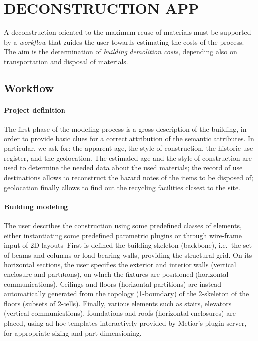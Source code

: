 \documentclass[a4paper,twoside]{article}
\begin{document}
%
\section{\uppercase{Deconstruction App}}
\label{sec:application}

\noindent
A deconstruction oriented to the maximum reuse of materials must be supported by a \emph{workflow} that guides the user towards estimating the costs of the process. The aim is the determination of  \emph{building demolition costs}, depending also on transportation  and disposal of materials.

\subsection{Workflow}

\paragraph{Project definition} 

\noindent
The first phase of the modeling process is a gross description of the building, in order to provide basic clues for a correct attribution of the semantic attributes.
In particular, we ask for: the apparent age, the style of construction, the historic use register, and the geolocation.
The estimated age and the style of construction are used to determine the needed data about the used materials; the record of use destinations allows to reconstruct the hazard notes of the items to be disposed of; geolocation finally allows to find out the recycling facilities closest to the site.

\paragraph{Building modeling} 

\noindent
The user describes the construction using some predefined classes of elements, either instantiating some  predefined parametric plugins or through wire-frame input of 2D layouts. 
First is defined the building skeleton (backbone), i.e.~the set of beams and columns or load-bearing walls, providing the structural grid.
On its horizontal sections, the user specifies the exterior and interior walls (vertical enclosure and partitions), on which the fixtures are positioned (horizontal communications).
Ceilings and floors (horizontal partitions) are instead automatically generated from the topology (1-boundary) of the 2-skeleton of the floors (subsets of 2-cells).
Finally, various elements such as stairs, elevators (vertical communications), foundations and roofs (horizontal enclosures) are placed, using ad-hoc templates interactively provided by Metior's plugin server, for appropriate sizing and part dimensioning.
\end{document}
